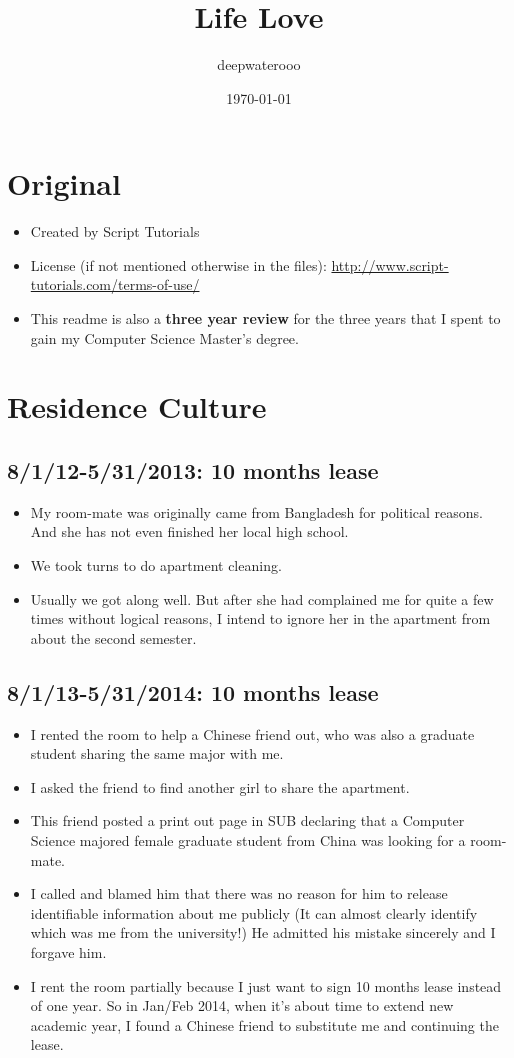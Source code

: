 \documentclass[9pt,b5paper]{article}
\author{deepwaterooo}
\date{\today}
\title{Life Love}
\begin{document}
\maketitle
\tableofcontents


\section{Original}
\label{sec-1}
\begin{itemize}
\item Created by Script Tutorials
\item License (if not mentioned otherwise in the files): \url{http://www.script-tutorials.com/terms-of-use/}
\item This readme is also a \textbf{three year review} for the three years that I spent to gain my Computer Science Master's degree.
\end{itemize}

\section{Residence Culture}
\label{sec-2}
\subsection{8/1/12-5/31/2013: 10 months lease}
\label{sec-2-1}
\begin{itemize}
\item My room-mate was originally came from Bangladesh for political reasons. And she has not even finished her local high school.
\item We took turns to do apartment cleaning.
\item Usually we got along well. But after she had complained me for quite a few times without logical reasons, I intend to ignore her in the apartment from about the second semester.
\end{itemize}
\subsection{8/1/13-5/31/2014: 10 months lease}
\label{sec-2-2}
\begin{itemize}
\item I rented the room to help a Chinese friend out, who was also a graduate student sharing the same major with me.
\item I asked the friend to find another girl to share the apartment.
\item This friend posted a print out page in SUB declaring that a Computer Science majored female graduate student from China was looking for a room-mate.
\item I called and blamed him that there was no reason for him to release identifiable information about me  publicly (It can almost clearly identify which was me from the university!) He admitted his mistake sincerely and I forgave him.
\item I rent the room partially because I just want to sign 10 months lease instead of one year. So in Jan/Feb 2014, when it's about time to extend new academic year, I found a Chinese friend to substitute me and continuing the lease.
\end{itemize}
\end{document}
